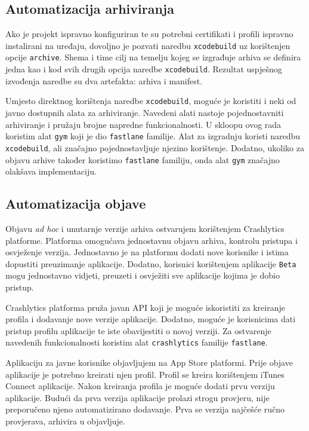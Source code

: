 \documentclass[times, utf8, diplomski, numeric]{fer}
\begin{document}
\subsection{Automatizacija arhiviranja}

Ako je projekt ispravno konfiguriran te su potrebni certifikati i profili ispravno instalirani na uređaju, dovoljno je pozvati naredbu \verb|xcodebuild| uz korištenjen opcije \verb|archive|. Shema i time cilj na temelju kojeg se izgrađuje arhiva se definira jedna kao i kod svih drugih opcija naredbe \verb|xcodebuild|. Rezultat uspješnog izvođenja naredbe su dva artefakta: arhiva i manifest.

Umjesto direktnog korištenja naredbe \verb|xcodebuild|, moguće je koristiti i neki od javno dostupnih alata za arhiviranje. Navedeni alati nastoje pojednostavniti arhiviranje i pružaju brojne napredne funkcionalnosti. U skloopu ovog rada koristim alat \verb|gym| koji je dio \verb|fastlane| familije. Alat za izgradnju koristi naredbu \verb|xcodebuild|, ali značajno pojednostavljuje njezino korištenje. Dodatno, ukoliko za objavu arhive također koristimo \verb|fastlane| familiju, onda alat \verb|gym| značajno olakšava implementaciju.


\subsection{Automatizacija objave}

Objavu \textit{ad hoc} i unutarnje verzije arhiva ostvarujem korištenjem Crashlytics platforme. Platforma omogućava jednostavnu objavu arhiva, kontrolu pristupa i osvježenje verzija. Jednostavno je na platformu dodati nove korisnike i istima dopustiti preuzimanje aplikacije. Dodatno, korisnici korištenjem aplikacije \verb|Beta| mogu jednostavno vidjeti, preuzeti i osvježiti sve aplikacije kojima je dobio pristup.

Crashlytics platforma pruža javan API koji je moguće iskoristiti za kreiranje profila i dodavanje nove verzije aplikacije. Dodatno, moguće je korisnicima dati pristup profilu aplikacije te iste obavijestiti o novoj verziji. Za ostvarenje navedenih funkcionalnosti koristim alat \verb|crashlytics| familije \verb|fastlane|.

Aplikaciju za javne korisnike objavljujem na App Store platformi. Prije objave aplikacije je potrebno kreirati njen profil. Profil se kreira korištenjem iTunes Connect aplikacije. Nakon kreiranja profila je moguće dodati prvu verziju aplikacije. Budući da prva verzija aplikacije prolazi strogu provjeru, nije preporučeno njeno automatizirano dodavanje. Prva se verzija najčešće ručno provjerava, arhivira u objavljuje.
\end{document}
